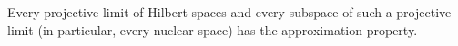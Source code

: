 Every projective limit of Hilbert spaces and every subspace of such a projective limit (in particular, every nuclear space) has the approximation property.
